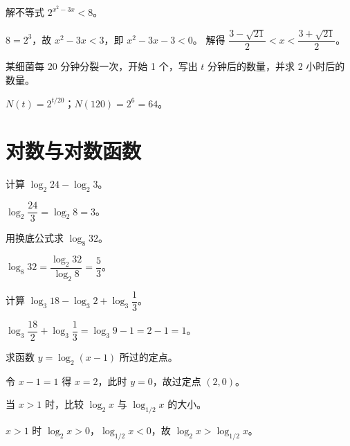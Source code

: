 \begin{problem}
解不等式 $2^{x^2-3x}<8$。
\end{problem}
\begin{solution}
$8=2^3$，故 $x^2-3x<3$，即 $x^2-3x-3<0$。
解得 $\dfrac{3-\sqrt{21}}{2}<x<\dfrac{3+\sqrt{21}}{2}$。
\end{solution}

\begin{problem}
某细菌每 20 分钟分裂一次，开始 1 个，写出 $t$ 分钟后的数量，并求 2 小时后的数量。
\end{problem}
\begin{solution}
$N(t)=2^{t/20}$；$N(120)=2^6=64$。
\end{solution}

\section{对数与对数函数}

\begin{problem}
计算 $\log_2 24-\log_2 3$。
\end{problem}
\begin{solution}
$\log_2\dfrac{24}{3}=\log_2 8=3$。
\end{solution}

\begin{problem}
用换底公式求 $\log_8 32$。
\end{problem}
\begin{solution}
$\log_8 32=\dfrac{\log_2 32}{\log_2 8}=\dfrac53$。
\end{solution}

\begin{problem}
计算 $\log_3 18-\log_3 2+\log_3\dfrac13$。
\end{problem}
\begin{solution}
$\log_3\dfrac{18}{2}+\log_3\dfrac13=\log_3 9-1=2-1=1$。
\end{solution}

\begin{problem}
求函数 $y=\log_2(x-1)$ 所过的定点。
\end{problem}
\begin{solution}
令 $x-1=1$ 得 $x=2$，此时 $y=0$，故过定点 $(2,0)$。
\end{solution}

\begin{problem}
当 $x>1$ 时，比较 $\log_2 x$ 与 $\log_{1/2} x$ 的大小。
\end{problem}
\begin{solution}
$x>1$ 时 $\log_2 x>0$，$\log_{1/2} x<0$，故 $\log_2 x>\log_{1/2} x$。
\end{solution}

